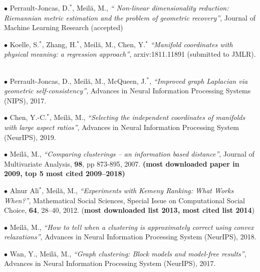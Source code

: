 \documentclass[11pt]{article}
\newcommand{\comment}[1]{}
\newcommand{\meila}{Meil\u{a}, M.}
\newcommand{\mysubtitle}[1]{\vspace{.1in}\hspace{-2em}{\bf #1\hspace{1.5em}}}
\begin{document}
$\bullet$  Perrault-Joncas, D.$^*$, \meila, {\it ``
  Non-linear dimensionality reduction: Riemannian metric estimation  and the problem of geometric recovery''}, Journal of Machine Learning Research (accepted)%

$\bullet$ Koelle, S.$^*$, Zhang, H.$^*$, \meila, Chen, Y.$^*$ {\it ``Manifold coordinates with physical meaning: a regression approach''}, arxiv:1811.11891 (submitted to JMLR). 

\comment{\\
$\bullet$ \meila, Wan, Y.$^*$, {\it ``Graph clustering: Block models and model free results''}, in Advances in Neural Information Processing Systems NIPS, 2016.}
\\
$\bullet$  Perrault-Joncas, D., \meila, McQueen, J.$^*$, {\it ``Improved graph Laplacian via geometric self-consistency''},  Advances in Neural Information Processing Systems (NIPS), 2017. 

$\bullet$  Chen, Y.-C.$^*$, \meila, {\it ``Selecting the independent coordinates of manifolds with large aspect ratios''}, Advances in Neural Information Processing System (NeurIPS), 2019.

\newpage
\mysubtitle{Other significant publications and products}

$\bullet$ \meila, {\it ``Comparing clusterings -- an information based distance''}, Journal of Multivariate Analysis, {\bf 98}, pp 873-895, 2007. {\small \bf (most downloaded paper in 2009, top 5 most cited 2009--2018)}


$\bullet$   Alnur Ali$^*$, \meila, {\it ``Experiments with Kemeny Ranking: What Works When?''}, Mathematical Social Sciences, Special Issue on Computational Social Choice, {\bf 64}, 28--40,   2012. {\small ({\bf most downloaded list 2013, most cited list 2014})}

$\bullet$  \meila, {\it ``How to tell when a clustering is approximately correct using convex relaxations''}, Advances in Neural Information Processing System (NeurIPS), 2018.

\comment{$\bullet$
Ali, A.$^*$, \meila, Murphy, T.B., Chen, H$^*$, {\it ``Preferences in college applications -- a non-parametric Bayesian analysis of top-
10 rankings''} NIPS Workshop on Computational Social Science and the Wisdom of Crowds, 2010 (oral presentation, 5 out of 45 submissions)
\\}

$\bullet$ Wan, Y., \meila, {\it ``Graph clustering: Block models and model-free results''},  Advances in Neural Information Processing System (NeurIPS), 2017.
\comment{$\bullet$ Li, Q.Y$^*$, Xia, Q., Wang, T.,  \meila, Hackett, M. 
{\it ``Analysis of the stochastic variation in {LTQ} single scan mass
spectra''}, Rapid Communications in Mass Spectrometry, {\bf 20}, 10,
pp. 1551--1557, 2006.}
\comment{$\bullet$
 Perrault-Joncas, D.$^*$, \meila, {\it ``Directed Graph Embedding: Continous Limit of Laplacian-based Operators''}, in Advances in Neural Information Processing Systems NIPS, 990--998, Curran Associates, 2011. (poster spotlight)}
\end{document}
